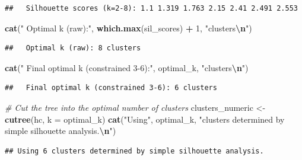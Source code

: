 \documentclass[
]{article}
\newenvironment{Shaded}{\begin{snugshade}}{\end{snugshade}}
\newcommand{\AttributeTok}[1]{\textcolor[rgb]{0.13,0.29,0.53}{#1}}
\newcommand{\CommentTok}[1]{\textcolor[rgb]{0.56,0.35,0.01}{\textit{#1}}}
\newcommand{\DecValTok}[1]{\textcolor[rgb]{0.00,0.00,0.81}{#1}}
\newcommand{\FunctionTok}[1]{\textcolor[rgb]{0.13,0.29,0.53}{\textbf{#1}}}
\newcommand{\NormalTok}[1]{#1}
\newcommand{\OtherTok}[1]{\textcolor[rgb]{0.56,0.35,0.01}{#1}}
\newcommand{\SpecialCharTok}[1]{\textcolor[rgb]{0.81,0.36,0.00}{\textbf{#1}}}
\newcommand{\StringTok}[1]{\textcolor[rgb]{0.31,0.60,0.02}{#1}}
\begin{document}
\begin{verbatim}
##   Silhouette scores (k=2-8): 1.1 1.319 1.763 2.15 2.41 2.491 2.553
\end{verbatim}

\begin{Shaded}
\begin{Highlighting}[]
\FunctionTok{cat}\NormalTok{(}\StringTok{"  Optimal k (raw):"}\NormalTok{, }\FunctionTok{which.max}\NormalTok{(sil\_scores) }\SpecialCharTok{+} \DecValTok{1}\NormalTok{, }\StringTok{"clusters}\SpecialCharTok{\textbackslash{}n}\StringTok{"}\NormalTok{)}
\end{Highlighting}
\end{Shaded}

\begin{verbatim}
##   Optimal k (raw): 8 clusters
\end{verbatim}

\begin{Shaded}
\begin{Highlighting}[]
\FunctionTok{cat}\NormalTok{(}\StringTok{"  Final optimal k (constrained 3{-}6):"}\NormalTok{, optimal\_k, }\StringTok{"clusters}\SpecialCharTok{\textbackslash{}n}\StringTok{"}\NormalTok{)}
\end{Highlighting}
\end{Shaded}

\begin{verbatim}
##   Final optimal k (constrained 3-6): 6 clusters
\end{verbatim}

\begin{Shaded}
\begin{Highlighting}[]
\CommentTok{\# Cut the tree into the optimal number of clusters}
\NormalTok{clusters\_numeric }\OtherTok{\textless{}{-}} \FunctionTok{cutree}\NormalTok{(hc, }\AttributeTok{k =}\NormalTok{ optimal\_k)}
\FunctionTok{cat}\NormalTok{(}\StringTok{"Using"}\NormalTok{, optimal\_k, }\StringTok{"clusters determined by simple silhouette analysis.}\SpecialCharTok{\textbackslash{}n}\StringTok{"}\NormalTok{)}
\end{Highlighting}
\end{Shaded}

\begin{verbatim}
## Using 6 clusters determined by simple silhouette analysis.
\end{verbatim}
\end{document}
